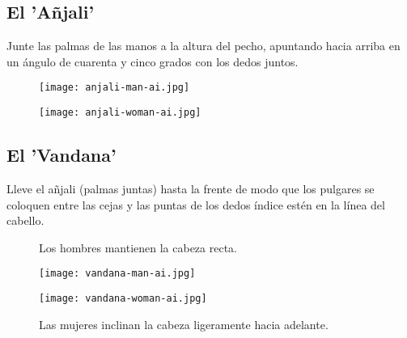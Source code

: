 \subsection{El 'Añjali'}

Junte las palmas de las manos a la altura del pecho, apuntando hacia arriba en un ángulo de cuarenta y cinco grados con los dedos juntos.
\begin{figure}[h]
	\centering
	
	\begin{minipage}{0.40\textwidth}
		\centering
		\texttt{[image: anjali-man-ai.jpg]}
	\end{minipage}
	\hfill
	\begin{minipage}{0.40\textwidth}
		\centering
		\texttt{[image: anjali-woman-ai.jpg]}
	\end{minipage}
	
\end{figure}

\subsection{El 'Vandana'}

Lleve el añjali (palmas juntas) hasta la frente de modo que los pulgares se coloquen entre las cejas y las puntas de los dedos índice estén en la línea del cabello.

\begin{figure}[h]
	\centering
	
	\begin{minipage}{0.40\textwidth}
		\centering
		\caption{Los hombres mantienen la cabeza recta.}
		\texttt{[image: vandana-man-ai.jpg]}
	\end{minipage}
	\hfill
	\begin{minipage}{0.40\textwidth}
		\centering
		\caption{Las mujeres inclinan la cabeza ligeramente hacia adelante.}
		\texttt{[image: vandana-woman-ai.jpg]}

	\end{minipage}
\end{figure}
\enlargethispage{3\baselineskip}
